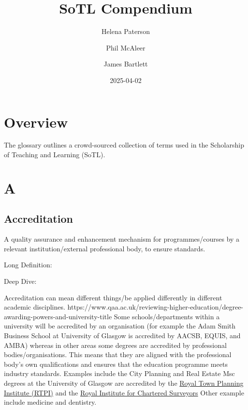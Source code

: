 \documentclass[
  letterpaper,
  DIV=11,
  numbers=noendperiod]{scrreprt}
\title{SoTL Compendium}
\author{Helena Paterson \and Phil McAleer \and James Bartlett}
\date{2025-04-02}
\renewcommand*\contentsname{Table of contents}
\newcommand\contentsname{Table of contents}
\begin{document}
\maketitle

\renewcommand*\contentsname{Table of contents}
{
\hypersetup{linkcolor=}
\setcounter{tocdepth}{2}
\tableofcontents
}


\chapter*{Overview}\label{overview}


The glossary outlines a crowd-sourced collection of terms used in the
Scholarship of Teaching and Learning (SoTL).


\chapter{A}\label{a}

\section{Accreditation}\label{accreditation}

A quality assurance and enhancement mechanism for programmes/courses by
a relevant institution/external professional body, to ensure standards.

Long Definition:

Deep Dive:

Accreditation can mean different things/be applied differently in
different academic disciplines.
https://www.qaa.ac.uk/reviewing-higher-education/degree-awarding-powers-and-university-title
Some schools/departments within a university will be accredited by an
organisation (for example the Adam Smith Business School at University
of Glasgow is accredited by AACSB, EQUIS, and AMBA) whereas in other
areas some degrees are accredited by professional bodies/organisations.
This means that they are aligned with the professional body's own
qualifications and ensures that the education programme meets industry
standards. Examples include the City Planning and Real Estate Msc
degrees at the University of Glasgow are accredited by the
\href{http://www.rtpi.org.uk\%20https://www.rtpi.org.uk/become-a-planner/study-at-university/wales-scotland-and-northern-ireland/}{Royal
Town Planning Institute (RTPI)} and the
\href{https://www.rics.org\%20https://www.rics.org/surveyor-careers/how-to-become-a-surveyor/university-surveying-courses}{Royal
Institute for Chartered Surveyors} Other example include medicine and
dentistry.
\end{document}

